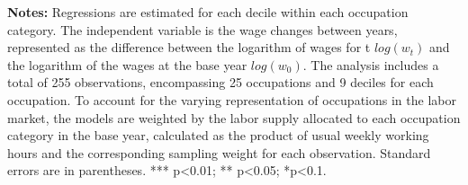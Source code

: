 \begin{table}[H]
\caption{\label{tab:reg fit of models-1}Regression Fit of Models for Changes
in Wages at Each Decile, by Two-Digit Occupation}

\begin{centering}
\noindent{}
\par\end{centering}
\medskip{}

\textbf{Notes:} Regressions are estimated for each decile within each
occupation category. The independent variable is the wage changes
between years, represented as the difference between the logarithm
of wages for t $log(w_{t})$ and the logarithm of the wages at the
base year $log(w_{0})$. The analysis includes a total of 255 observations,
encompassing 25 occupations and 9 deciles for each occupation. To
account for the varying representation of occupations in the labor
market, the models are weighted by the labor supply allocated to each
occupation category in the base year, calculated as the product of
usual weekly working hours and the corresponding sampling weight for
each observation. Standard errors are in parentheses. {*}{*}{*} p<0.01;
{*}{*} p<0.05; {*}p<0.1. 
\end{table}
